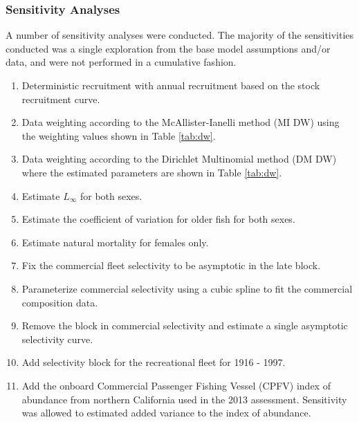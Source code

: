 \documentclass[11pt,
  english,
  a4paper,
]{article}
\begin{document}

\hypertarget{sensitivity-analyses}{%
\subsubsection{Sensitivity Analyses}\label{sensitivity-analyses}}

\leavevmode\tagmcend\tagstructend


A number of sensitivity analyses were conducted. The majority of the sensitivities conducted was a single exploration from the base model assumptions and/or data, and were not performed in a cumulative fashion.

\leavevmode\tagmcend\tagstructend\par

\begin{enumerate}
   
  \item Deterministic recruitment with annual recruitment based on the stock recruitment curve. 

  \item Data weighting according to the McAllister-Ianelli method (MI DW) using the weighting values shown in Table \ref{tab:dw}. 
  
  \item Data weighting according to the Dirichlet Multinomial method (DM DW) where the estimated parameters are shown in Table \ref{tab:dw}. 

  \item Estimate $L_{\infty}$ for both sexes.

  \item Estimate the coefficient of variation for older fish for both sexes.

  \item Estimate natural mortality for females only.

  \item Fix the commercial fleet selectivity to be asymptotic in the late block.

  \item Parameterize commercial selectivity using a cubic spline to fit the commercial composition data. 

  \item Remove the block in commercial selectivity and estimate a single asymptotic selectivity curve. 

  \item Add selectivity block for the recreational fleet for 1916 - 1997.

  \item Add the onboard Commercial Passenger Fishing Vessel (CPFV) index of abundance from northern California used in the 2013 assessment. Sensitivity was allowed to estimated added variance to the index of abundance.
  
\end{enumerate}
\end{document}
